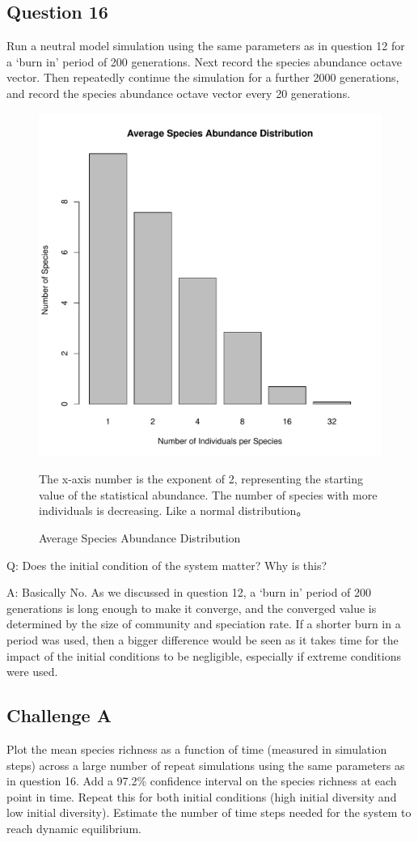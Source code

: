 \documentclass[12pt]{article}
\begin{document}
\subsection{Question 16}
Run a neutral model simulation using the same parameters as in question 12 for a ‘burn in’ period of 200 generations. Next record the species abundance octave vector. Then repeatedly continue the simulation for a further 2000 generations, and record the species abundance octave vector every 20 generations.

\begin{figure}[!ht]
\centering 
\includegraphics[width = 0.6\hsize]{../../results/Question16.pdf} 
\caption{Average Species Abundance Distribution}
The x-axis number is the exponent of 2, representing the starting value of the statistical abundance. The number of species with more individuals is decreasing. Like a normal distribution。
\end{figure}

Q: Does the initial condition of the system matter?  Why is this?

A: Basically No. As we discussed in question 12, a ‘burn in’ period of 200 generations is long enough to make it converge, and the converged value is determined by the size of community and speciation rate. If a shorter burn in a period was used, then a bigger difference would be seen as it takes time for the impact of the initial conditions to be negligible, especially if extreme conditions were used.


\subsection{Challenge A}
Plot the mean species richness as a function of time (measured in simulation steps) across a large number of repeat simulations using the same parameters as in question 16.  Add a 97.2\% confidence interval on the species richness at each point in time.  Repeat this for both initial conditions (high initial diversity and low initial diversity). Estimate the number of time steps needed for the system to reach dynamic equilibrium.
\end{document}
